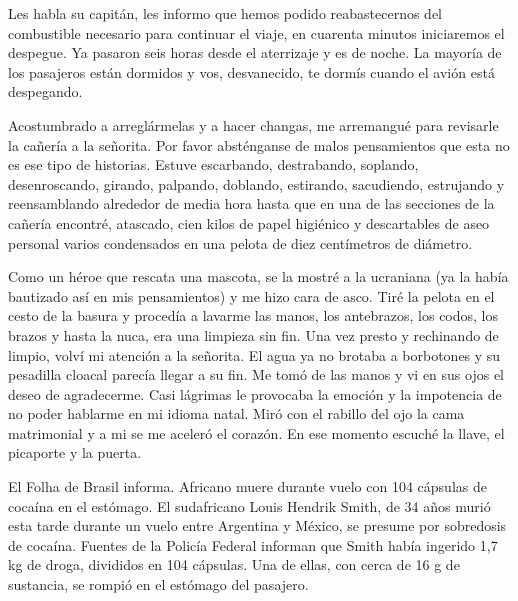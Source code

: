 \documentclass[11pt,twoside,openright,a6paper]{book}
\begin{document}
Les habla su capitán, les informo que hemos podido reabastecernos
del combustible necesario para continuar el viaje, en cuarenta minutos
iniciaremos el despegue. Ya pasaron seis horas desde el aterrizaje y es
de noche. La mayoría de los pasajeros están dormidos y vos, desvanecido,
te dormís cuando el avión está despegando.


\vspace{0.5cm}
\hrulefill\hspace{0.2cm} \decofourleft\decofourright \hspace{0.2cm} \hrulefill
\vspace{0.5cm}

  Acostumbrado a
arreglármelas y a hacer changas, me arremangué para revisarle la cañería a
la señorita. Por favor absténganse de malos pensamientos que esta no es ese
tipo de historias. Estuve escarbando, destrabando, soplando, desenroscando,
girando, palpando, doblando, estirando, sacudiendo, estrujando y reensamblando
alrededor de media hora hasta que en una de las secciones de la cañería
encontré, atascado, cien kilos de papel higiénico y descartables de aseo
personal varios condensados en una pelota de diez centímetros de diámetro.

Como un héroe que rescata una mascota, se la mostré a la ucraniana (ya la
había bautizado así en mis pensamientos) y me hizo cara de asco. Tiré
la pelota en el cesto de la basura y procedía a lavarme las manos, los
antebrazos, los codos, los brazos y hasta la nuca, era una limpieza sin fin.
Una vez presto y rechinando de limpio, volví mi atención a la señorita. El
agua ya no brotaba a borbotones y su pesadilla cloacal parecía llegar a su
fin. Me tomó de las manos y vi en sus ojos el deseo de agradecerme. Casi
lágrimas le provocaba la emoción y la impotencia de no poder hablarme en
mi idioma natal. Miró con el rabillo del ojo la cama matrimonial y a mi
se me aceleró el corazón. En ese momento escuché la llave, el picaporte
y la puerta.


\vspace{0.5cm}
\hrulefill\hspace{0.2cm} \decofourleft\decofourright \hspace{0.2cm} \hrulefill
\vspace{0.5cm}

El Folha de Brasil informa. Africano muere
durante vuelo con 104 cápsulas de cocaína en el estómago.  El sudafricano
Louis Hendrik Smith, de 34 años murió esta tarde durante un vuelo entre
Argentina y México, se presume por sobredosis de cocaína. Fuentes de
la Policía Federal informan que Smith había ingerido 1,7 kg de droga,
divididos en 104 cápsulas. Una de ellas, con cerca de 16 g de sustancia,
se rompió en el estómago del pasajero.
\end{document}
